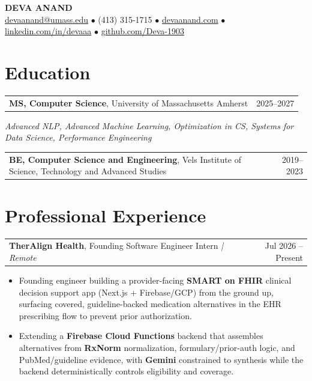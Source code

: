 \documentclass[letterpaper,11pt]{article}
\makeatletter
\newcommand{\eduItem}[3]{%
  \begin{tabular*}{\textwidth}{@{}l@{\extracolsep{\fill}}r@{}}
    \textbf{#1}, #2 & #3 \\
  \end{tabular*}\par
}
\newcommand{\expItem}[4]{%
  \vspace{2pt}
  \begin{tabular*}{\textwidth}{@{}l@{\extracolsep{\fill}}r@{}}
    \textbf{#1}, #2 \textit{| #3} & #4 \\
  \end{tabular*}\par\vspace{-3pt}
}
\makeatother
\begin{document}
\begin{center}
    {\fontsize{18}{20}\selectfont\bfseries DEVA ANAND}\\ \vspace{3pt}
    {\small
    \href{mailto:devaanand@umass.edu}{devaanand@umass.edu}
    \enspace$\bullet$\enspace
    (413) 315-1715
    \enspace$\bullet$\enspace
    \href{https://devaanand.com}{devaanand.com}
    \enspace$\bullet$\enspace
    \href{https://linkedin.com/in/devaaa/}{linkedin.com/in/devaaa}
    \enspace$\bullet$\enspace
    \href{https://github.com/Deva-1903}{github.com/Deva-1903}}
\end{center}
\vspace{-8pt}

\section{Education}
\eduItem{MS, Computer Science}{University of Massachusetts Amherst}{2025--2027}
{\small\textit{Advanced NLP, Advanced Machine Learning, Optimization in CS, Systems for Data Science, Performance Engineering}}\par
\vspace{3pt}
\eduItem{BE, Computer Science and Engineering}{Vels Institute of Science, Technology and Advanced Studies}{2019--2023}

\section{Professional Experience}

\expItem{TherAlign Health}{Founding Software Engineer Intern}{Remote}{Jul 2026 -- Present}
\begin{itemize}
  \item Founding engineer building a provider-facing \textbf{SMART on FHIR} clinical decision support app (Next.js + Firebase/GCP) from the ground up, surfacing covered, guideline-backed medication alternatives in the EHR prescribing flow to prevent prior authorization.
  \item Extending a \textbf{Firebase Cloud Functions} backend that assembles alternatives from \textbf{RxNorm} normalization, formulary/prior-auth logic, and PubMed/guideline evidence, with \textbf{Gemini} constrained to synthesis while the backend deterministically controls eligibility and coverage.
\end{itemize}
\end{document}

